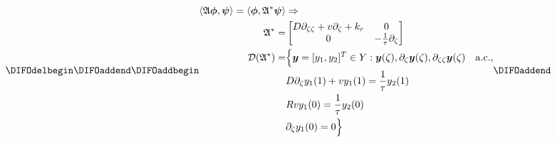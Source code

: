 \begin{equation} \label{eq:adjoint_A}
    \DIFdelbegin %
\DIFdelend \DIFaddbegin \begin{aligned}
        \langle \mathfrak{A} \bm{\phi}, \bm{\psi}\rangle  = \langle \bm{\phi}, {\mathfrak{A}}^{*} \bm{\psi}\rangle  &\Rightarrow \\
        {\mathfrak{A}}^{*} =&
        \begin{bmatrix}
            D \partial_{\zeta \zeta} + v \partial_\zeta +k_r & 0\\
            0 & -\frac{1}{\tau} \partial_\zeta
        \end{bmatrix}\\
        \mathcal{D}(\mathfrak{A}^*) =& \Bigl\{ \bm{y} = [y_1, y_2]^T \in Y:
        \bm{y}(\zeta), \partial_\zeta \bm{y}(\zeta), \partial_{\zeta \zeta} \bm{y}(\zeta) \quad \mathrm{a.c.},\\
        &D \partial_\zeta y_1(1) + v y_1(1) = \frac{1}{\tau} y_2(1) \\
        &R v y_1(0) = \frac{1}{\tau} y_2(0) \\
        &\partial_\zeta y_1(0) = 0 \Bigr\}
    \end{aligned}\DIFaddend 
\end{equation}

